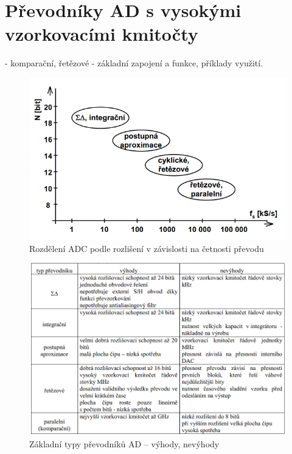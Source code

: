\section{Převodníky AD s vysokými vzorkovacími kmitočty}
- komparační, řetězové - základní zapojení a funkce, příklady využití.
\begin{figure}[h]
   \begin{center}
     \includegraphics[scale=0.6]{images/ADroz.png}
   \end{center}
   \caption{Rozdělení ADC podle rozlišení v závislosti na četnosti převodu}
\end{figure}
\begin{figure}[h]
   \begin{center}
     \includegraphics[scale=0.6]{images/ADroztab.png}
   \end{center}
   \caption{Základní typy převodníků AD – výhody, nevýhody}
\end{figure}

